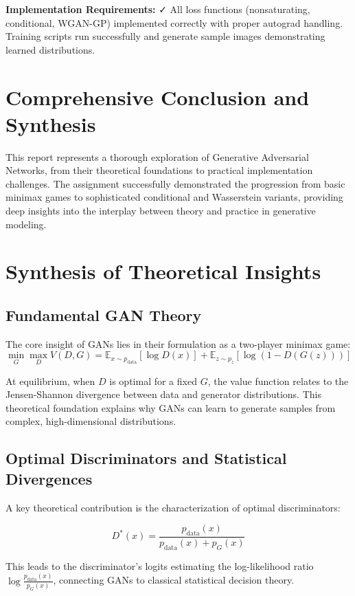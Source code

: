 \documentclass{article}
\begin{document}
\textbf{Implementation Requirements:} ✓ All loss functions (nonsaturating, conditional, WGAN-GP) implemented correctly with proper autograd handling. Training scripts run successfully and generate sample images demonstrating learned distributions.

\section{Comprehensive Conclusion and Synthesis}

This report represents a thorough exploration of Generative Adversarial Networks, from their theoretical foundations to practical implementation challenges. The assignment successfully demonstrated the progression from basic minimax games to sophisticated conditional and Wasserstein variants, providing deep insights into the interplay between theory and practice in generative modeling.

\section{Synthesis of Theoretical Insights}

\subsection{Fundamental GAN Theory}

The core insight of GANs lies in their formulation as a two-player minimax game:
\[
\min_G \max_D V(D, G) = \mathbb{E}_{x \sim p_{\text{data}}} [\log D(x)] + \mathbb{E}_{z \sim p_z} [\log(1 - D(G(z)))]
\]

At equilibrium, when $D$ is optimal for a fixed $G$, the value function relates to the Jensen-Shannon divergence between data and generator distributions. This theoretical foundation explains why GANs can learn to generate samples from complex, high-dimensional distributions.

\subsection{Optimal Discriminators and Statistical Divergences}

A key theoretical contribution is the characterization of optimal discriminators:

\[
D^*(x) = \frac{p_{\text{data}}(x)}{p_{\text{data}}(x) + p_G(x)}
\]

This leads to the discriminator's logits estimating the log-likelihood ratio $\log \frac{p_{\text{data}}(x)}{p_G(x)}$, connecting GANs to classical statistical decision theory.
\end{document}
